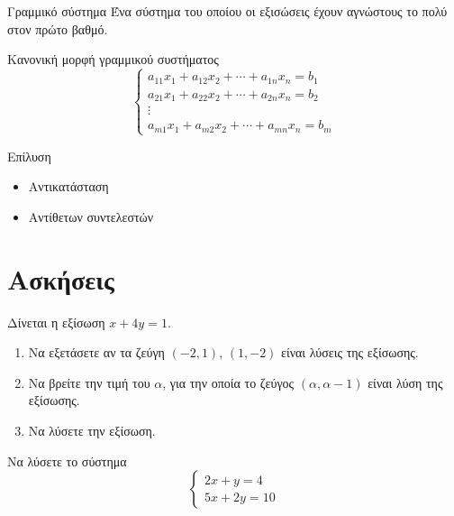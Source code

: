 \documentclass{presentation}
\begin{document}
\begin{frame}
  \begin{block}{Γραμμικό σύστημα}
    Ένα σύστημα του οποίου οι εξισώσεις έχουν αγνώστους το πολύ στον πρώτο βαθμό.
  \end{block}
  \begin{block}{Κανονική μορφή γραμμικού συστήματος}
    $$
      \begin{cases}
        a_{11}x_1+a_{12}x_2+\cdots+a_{1n}x_n=b_1 \\
        a_{21}x_1+a_{22}x_2+\cdots+a_{2n}x_n=b_2 \\
        \vdots                                   \\
        a_{m1}x_1+a_{m2}x_2+\cdots+a_{mn}x_n=b_m
      \end{cases}
    $$
  \end{block}

\end{frame}

\begin{frame}{Επίλυση}
  \begin{itemize}[<+- | alert@+>]
    \item Αντικατάσταση
    \item Αντίθετων συντελεστών
  \end{itemize}
\end{frame}

\section{Ασκήσεις}
\exercises

\begin{askisi}
  Δίνεται η εξίσωση $x+4y=1$.
  \begin{enumerate}
    \item Να εξετάσετε αν τα ζεύγη $(-2,1)$, $(1,-2)$ είναι λύσεις της εξίσωσης.
    \item Να βρείτε την τιμή του $α$, για την οποία το ζεύγος $(α,α-1)$ είναι λύση της εξίσωσης.
    \item Να λύσετε την εξίσωση.
  \end{enumerate}
\end{askisi}

\begin{askisi}
  Να λύσετε το σύστημα
  $$\begin{cases}
      2x+y=4 \\
      5x+2y=10
    \end{cases}$$
\end{askisi}
\end{document}
